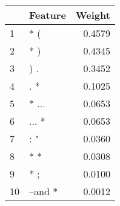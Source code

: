 \begin{tabular}{llr}
\toprule
{} &  Feature &  Weight \\
\midrule
1  &      * ( &  0.4579 \\
2  &      * ) &  0.4345 \\
3  &      ) . &  0.3452 \\
4  &      . * &  0.1025 \\
5  &    * ... &  0.0653 \\
6  &    ... * &  0.0653 \\
7  &      : " &  0.0360 \\
8  &      * * &  0.0308 \\
9  &      * ; &  0.0100 \\
10 &  --and * &  0.0012 \\
\bottomrule
\end{tabular}

